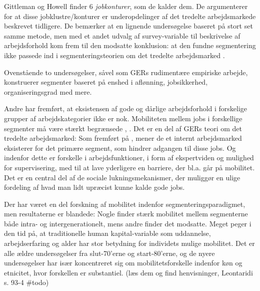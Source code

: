 Gittleman og Howell finder 6 \emph{jobkonturer}, som de kalder dem. De argumenterer for at disse jobklustre/konturer er underopdelinger af det tredelte arbejdsmarkede beskrevet tidligere. De bemærker at en lignende undersøgelse baseret på stort set samme metode, men med et andet udvalg af survey-variable til beskrivelse af arbejdsforhold kom frem til den modsatte konklusion: at den fundne segmentering ikke passede ind i segmenteringsteorien om det tredelte arbejdsmarked \parencite[428]{Gittleman1995}. 

Ovenstående to undersøgelser, såvel som GERs rudimentære empiriske arbejde, konstruerer segmenter baseret på enshed i aflønning, jobsikkerhed, organiseringsgrad med mere.  



Andre har fremført, at eksistensen af gode og dårlige arbejdsforhold i forskelige grupper af arbejdskategorier ikke er nok. Mobiliteten mellem jobs i forskellige segmenter må være stærkt begrænsede \parencite[92]{Leontaridi1998}, \parencite[793]{DickensLang1985}.  %
Det er en del af GERs teori om det tredelte arbejdsmarked: Som fremført på , mener de et internt arbejdsmarked eksisterer for det primære segment, som hindrer adgangen til disse jobs. Og indenfor dette er forskelle i arbejdsfunktioner, i form af ekspertviden og mulighed for supervisering, med til at lave yderligere en barriere, der bl.a. går på mobilitet. Det er en central del af de sociale lukningsmekanismer, der muliggør en ulige fordeling af hvad man lidt upræcist kunne kalde gode jobs. 

Der har været en del forskning af mobilitet indenfor segmenteringsparadigmet, men resultaterne er blandede: Nogle finder  stærk mobilitet mellem segmenterne både intra- og intergenerationelt, mens andre finder det modsatte. Meget peger i den tid på, at traditionelle human kapital-variable som uddannelse, arbejdserfaring og alder har stor betydning for individets mulige mobilitet. Det er alle ældre undersøgelser fra slut-70'erne og start-80'erne, og de nyere undersøgelser har især koncentreret sig om mobilitetsforskelle indenfor køn og etnicitet, hvor forskellen er substantiel. (læs dem og find henvisninger, Leontaridi s. 93-4 \#todo)






